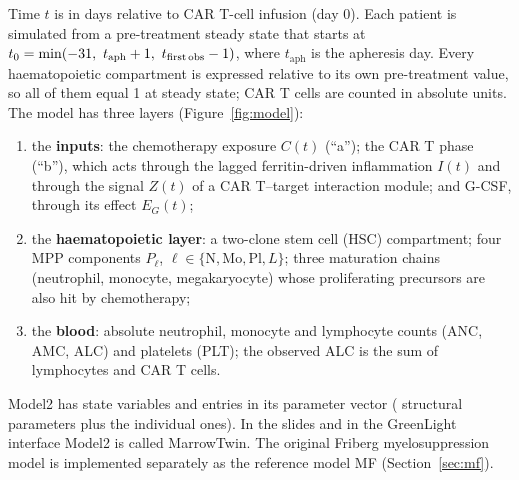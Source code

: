 \documentclass[11pt]{article}
\begin{document}
Time $t$ is in days relative to CAR T-cell infusion (day 0). Each patient is simulated from a pre-treatment steady state that starts at $t_0=\min(\valTmin,\ t_{\mathrm{aph}}+1,\ t_{\mathrm{first\,obs}}-1)$, where $t_{\mathrm{aph}}$ is the apheresis day. Every haematopoietic compartment is expressed relative to its own pre-treatment value, so all of them equal 1 at steady state; CAR T cells are counted in absolute units. The model has three layers (Figure~\ref{fig:model}):
\begin{enumerate}
\item the \textbf{inputs}: the chemotherapy exposure $C(t)$ (``a''); the CAR T phase (``b''), which acts through the lagged ferritin-driven inflammation $I(t)$ and through the signal $Z(t)$ of a CAR T--target interaction module; and G-CSF, through its effect $E_G(t)$;
\item the \textbf{haematopoietic layer}: a two-clone stem cell (HSC) compartment; four MPP components $P_\ell$, $\ell\in\{\mathrm{N},\mathrm{Mo},\mathrm{Pl},L\}$; three maturation chains (neutrophil, monocyte, megakaryocyte) whose proliferating precursors are also hit by chemotherapy;
\item the \textbf{blood}: absolute neutrophil, monocyte and lymphocyte counts (ANC, AMC, ALC) and platelets (PLT); the observed ALC is the sum of lymphocytes and CAR T cells.
\end{enumerate}
Model2 has \valNStates{} state variables and \valNPar{} entries in its parameter vector (\valNStruct{} structural parameters plus the individual ones). In the slides and in the GreenLight interface Model2 is called MarrowTwin. The original Friberg myelosuppression model \citep{friberg2002} is implemented separately as the reference model MF (Section~\ref{sec:mf}).
\end{document}
